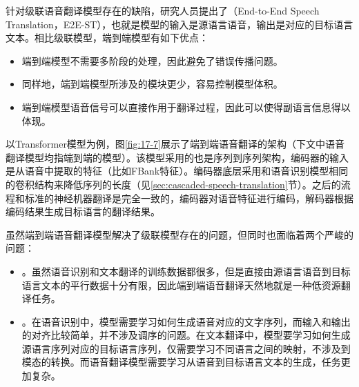 \parinterval 针对级联语音翻译模型存在的缺陷，研究人员提出了{\small{}}（End-to-End Speech Translation，E2E-ST），也就是模型的输入是源语言语音，输出是对应的目标语言文本。相比级联模型，端到端模型有如下优点：

\begin{itemize}
    \vspace{0.5em}
    \item 端到端模型不需要多阶段的处理，因此避免了错误传播问题。
    \vspace{0.5em}
    \item 同样地，端到端模型所涉及的模块更少，容易控制模型体积。
    \vspace{0.5em}
    \item 端到端模型语音信号可以直接作用于翻译过程，因此可以使得副语言信息得以体现。
    \vspace{0.5em}
\end{itemize}

\parinterval 以Transformer模型为例，图\ref{fig:17-7}展示了端到端语音翻译的架构（下文中语音翻译模型均指端到端的模型）。该模型采用的也是序列到序列架构，编码器的输入是从语音中提取的特征（比如FBank特征）。编码器底层采用和语音识别模型相同的卷积结构来降低序列的长度（见\ref{sec:cascaded-speech-translation}节）。之后的流程和标准的神经机器翻译是完全一致的，编码器对语音特征进行编码，解码器根据编码结果生成目标语言的翻译结果。

\parinterval 虽然端到端语音翻译模型解决了级联模型存在的问题，但同时也面临着两个严峻的问题：

\begin{itemize}
    \vspace{0.5em}
    \item {\small{}}。虽然语音识别和文本翻译的训练数据都很多，但是直接由源语言语音到目标语言文本的平行数据十分有限，因此端到端语音翻译天然地就是一种低资源翻译任务。
    \vspace{0.5em}
    \item {\small{}}。在语音识别中，模型需要学习如何生成语音对应的文字序列，而输入和输出的对齐比较简单，并不涉及调序的问题。在文本翻译中，模型要学习如何生成源语言序列对应的目标语言序列，仅需要学习不同语言之间的映射，不涉及到模态的转换。而语音翻译模型需要学习从语音到目标语言文本的生成，任务更加复杂。
    \vspace{0.5em}
\end{itemize}

